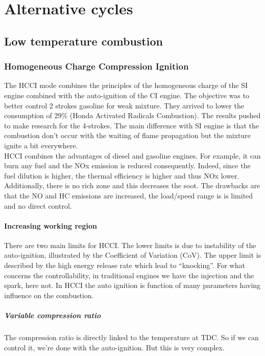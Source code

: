 
\chapter{Alternative cycles}
\section{Low temperature combustion}
\subsection{Homogeneous Charge Compression Ignition}
	The HCCI mode combines the principles of the homogeneous charge of the SI engine combined with the auto-ignition of the CI engine. The objective was to better control 2 strokes gasoline for weak mixture. They arrived to lower the consumption of 29\% (Honda Activated Radicals Combustion). The results pushed to make research for the 4-strokes. The main difference with SI engine is that the combustion don't occur with the waiting of flame propagation but the mixture ignite a bit everywhere. \\
	
	HCCI combines the advantages of diesel and gasoline engines. For example, it can burn any fuel and the NOx emission is reduced consequently. Indeed, since the fuel dilution is higher, the thermal efficiency is higher and thus NOx lower. Additionally, there is no rich zone and this decreases the soot.  The drawbacks are that the NO and HC emissions are increased, the load/speed range is is limited and no direct control. 
	
\subsubsection{Increasing working region}	
	There are two main limits for HCCI. The lower limits is due to instability of the auto-ignition, illustrated by the Coefficient of Variation (CoV). The upper limit is described by the high energy release rate which lead to “knocking”. For what concerns the controllability, in traditional engines we have the injection and the spark, here not. In HCCI the auto ignition is function of many parameters having influence on the combustion. 	
	
	\paragraph{Variable compression ratio} The compression ratio is directly linked to the temperature at TDC. So if we can control it, we're done with the auto-ignition. But this is very complex. 
	

